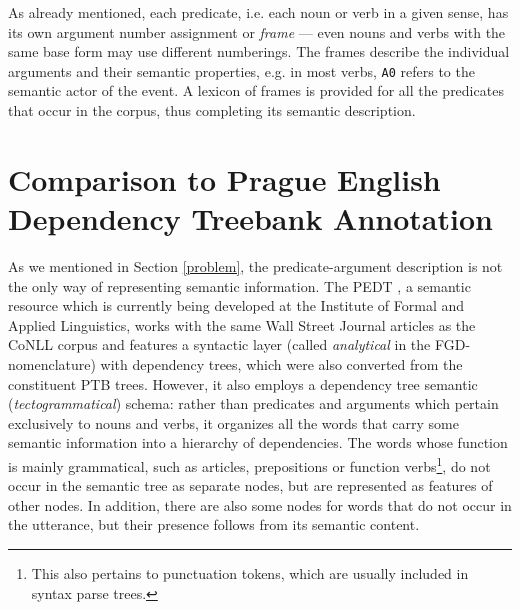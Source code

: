 \documentclass[12pt,notitlepage]{report}
\begin{document}
As already mentioned, each predicate, i.e. each noun or verb in a given sense, has its own argument number assignment or \emph{frame} --- even nouns and verbs with the same base form may use different numberings. The frames describe the individual arguments and their semantic properties, e.g. in most verbs, \texttt{A0} refers to the semantic actor of the event. A lexicon of frames is provided for all the predicates that occur in the corpus, thus completing its semantic description.

\section{Comparison to Prague English Dependency Treebank Annotation}

As we mentioned in Section \ref{problem}, the predicate-argument description is not the only way of representing semantic information. The PEDT \citep{cinkova09}, a semantic resource which is currently being developed at the Institute of Formal and Applied Linguistics, works with the same Wall Street Journal articles as the CoNLL corpus and features a syntactic layer (called \emph{analytical} in the FGD-nomenclature) with dependency trees, which were also converted from the constituent PTB trees. However, it also employs a dependency tree semantic (\emph{tectogrammatical}) schema: rather than predicates and arguments which pertain exclusively to nouns and verbs, it organizes all the words that carry some semantic information into a hierarchy of dependencies. The words whose function is mainly grammatical, such as articles, prepositions or function verbs\footnote{This also pertains to punctuation tokens, which are usually included in syntax parse trees.}, do not occur in the semantic tree as separate nodes, but are represented as features of other nodes. In addition, there are also some nodes for words that do not occur in the utterance, but their presence follows from its semantic content. 
\end{document}
